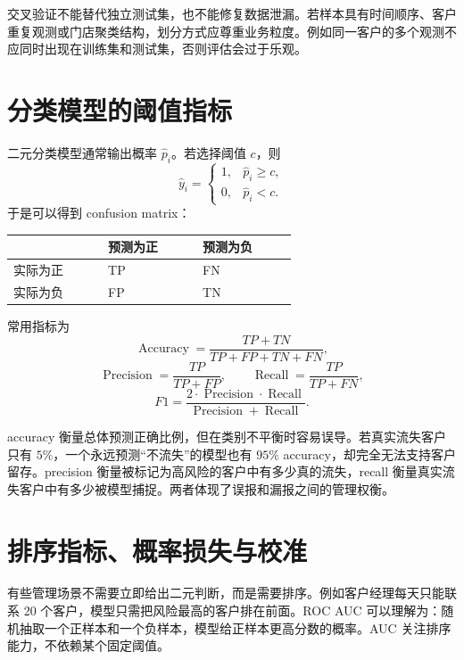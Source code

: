 \documentclass[UTF8,fontset=fandol,openany,zihao=-4]{ctexbook}
\begin{document}
交叉验证不能替代独立测试集，也不能修复数据泄漏。若样本具有时间顺序、客户重复观测或门店聚类结构，划分方式应尊重业务粒度。例如同一客户的多个观测不应同时出现在训练集和测试集，否则评估会过于乐观。

\section{分类模型的阈值指标}

二元分类模型通常输出概率 \(\hat p_i\)。若选择阈值 \(c\)，则
\[
  \hat y_i=
  \begin{cases}
    1,& \hat p_i\ge c,\\
    0,& \hat p_i<c.
  \end{cases}
\]
于是可以得到 confusion matrix：

\begin{center}
\begin{tabular}{>{\raggedright\arraybackslash}p{0.22\linewidth}>{\centering\arraybackslash}p{0.22\linewidth}>{\centering\arraybackslash}p{0.22\linewidth}}
\toprule
 & 预测为正 & 预测为负\\
\midrule
实际为正 & TP & FN\\
实际为负 & FP & TN\\
\bottomrule
\end{tabular}
\end{center}

常用指标为
\[
  \operatorname{Accuracy}=\frac{TP+TN}{TP+FP+TN+FN},
\]
\[
  \operatorname{Precision}=\frac{TP}{TP+FP},
  \qquad
  \operatorname{Recall}=\frac{TP}{TP+FN},
\]
\[
  F1=
  \frac{2\cdot \operatorname{Precision}\cdot \operatorname{Recall}}
       {\operatorname{Precision}+\operatorname{Recall}}.
\]

accuracy 衡量总体预测正确比例，但在类别不平衡时容易误导。若真实流失客户只有 \(5\%\)，一个永远预测“不流失”的模型也有 \(95\%\) accuracy，却完全无法支持客户留存。precision 衡量被标记为高风险的客户中有多少真的流失，recall 衡量真实流失客户中有多少被模型捕捉。两者体现了误报和漏报之间的管理权衡。

\section{排序指标、概率损失与校准}

有些管理场景不需要立即给出二元判断，而是需要排序。例如客户经理每天只能联系 20 个客户，模型只需把风险最高的客户排在前面。ROC AUC 可以理解为：随机抽取一个正样本和一个负样本，模型给正样本更高分数的概率。AUC 关注排序能力，不依赖某个固定阈值。
\end{document}
